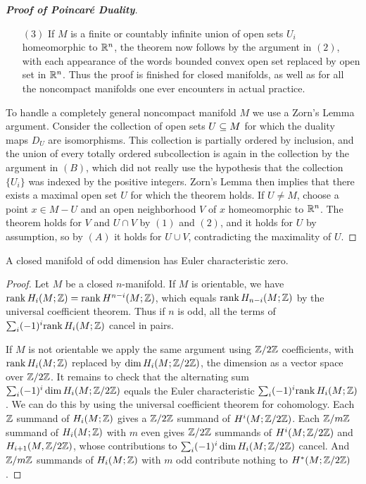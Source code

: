 \begin{proof}[\textbf{Proof of Poincar\'e Duality}]
\begin{itemize}
\item[$(3)$]If $M$ is a finite or countably infinite union of open sets $U_i$ homeomorphic to $\mathbb{R}^n$, the theorem now follows by the argument in $(2)$, with each appearance of the words bounded convex open set replaced by open set in $\mathbb{R}^n$. Thus the proof is finished for closed manifolds, as well as for all the noncompact manifolds one ever encounters in actual practice.
\end{itemize}
To handle a completely general noncompact manifold $M$ we use a Zorn's Lemma
argument. Consider the collection of open sets $U\subseteq M$ for which the duality maps $D_U$ are isomorphisms. This collection is partially ordered by inclusion, and the union of every totally ordered subcollection is again in the collection by the argument in $(B)$, which did not really use the hypothesis that the collection $\{U_i\}$ was indexed by the positive integers. Zorn's Lemma then implies that there exists a maximal open set $U$ for which the theorem holds. If $U\neq M$, choose a point $x\in M-U$ and an open neighborhood $V$ of $x$ homeomorphic to $\mathbb{R}^n$. The theorem holds for $V$ and $U\cap V$ by $(1)$ and $(2)$, and it holds for $U$ by assumption, so by $(A)$ it holds for $U\cup V$, contradicting the maximality of $U$.
\end{proof}
\begin{corollary}
A closed manifold of odd dimension has Euler characteristic zero.
\end{corollary}
\begin{proof}
Let $M$ be a closed $n$-manifold. If $M$ is orientable, we have $\mathrm{rank}\, H_i(M;\mathbb{Z})=\mathrm{rank}\, H^{n-i}(M;\mathbb{Z})$, which equals $\mathrm{rank}\, H_{n-i}(M;\mathbb{Z})$ by the universal coefficient theorem. Thus if $n$ is odd, all the terms of $\sum_i(-1)^i\mathrm{rank}\, H_i(M;\mathbb{Z})$ cancel in pairs.\par
If $M$ is not orientable we apply the same argument using $\mathbb{Z}/2\mathbb{Z}$ coefficients, with $\mathrm{rank}\, H_i(M;\mathbb{Z})$ replaced by $\dim H_i(M;\mathbb{Z}/2\mathbb{Z})$, the dimension as a vector space over $\mathbb{Z}/2\mathbb{Z}$. It remains to check that the alternating sum $\sum_i(-1)^i\dim H_i(M;\mathbb{Z}/2\mathbb{Z})$ equals the Euler characteristic $\sum_i(-1)^i\mathrm{rank}\, H_i(M;\mathbb{Z})$. We can do this by using
the universal coefficient theorem for cohomology. Each $\mathbb{Z}$ summand of $H_i(M;\mathbb{Z})$ gives a $\mathbb{Z}/2\mathbb{Z}$ summand of $H^i(M;\mathbb{Z}/2\mathbb{Z})$. Each $\mathbb{Z}/m\mathbb{Z}$ summand of $H_i(M;\mathbb{Z})$ with $m$ even gives $\mathbb{Z}/2\mathbb{Z}$ summands of $H^i(M;\mathbb{Z}/2\mathbb{Z})$ and $H_{i+1}(M,\mathbb{Z}/2\mathbb{Z})$, whose contributions to $\sum_i(-1)^i\dim H_i(M;\mathbb{Z}/2\mathbb{Z})$ cancel. And $\mathbb{Z}/m\mathbb{Z}$ summands of $H_i(M;\mathbb{Z})$ with $m$ odd contribute nothing to $H^*(M;\mathbb{Z}/2\mathbb{Z})$.
\end{proof}
